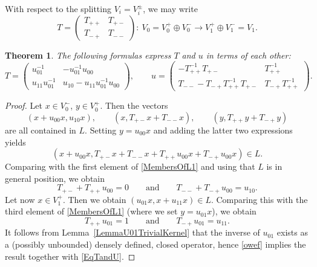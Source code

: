 \documentclass[pdftex]{sigma}
\numberwithin{equation}{section}
\newtheorem{Theorem}{Theorem}[section]
\begin{document}
With respect to the splitting $V_i = V_i^{\pm}$, we may write
\begin{equation*}
 T = \begin{pmatrix} T_{++} & T_{+-} \\ T_{-+} & T_{--} \end{pmatrix}\colon\ V_0 = V_0^+ \oplus V_0^- \longrightarrow V_1^+ \oplus V_1^- = V_1.
\end{equation*}

\begin{Theorem} \label{TheoremRelationTu}
The following formulas express $T$ and $u$ in terms of each other:
\begin{equation*}
 T = \begin{pmatrix} u_{01}^{-1} & -u_{01}^{-1} u_{00} \\ u_{11} u_{01}^{-1} & u_{10} - u_{11} u_{01}^{-1}u_{00} \end{pmatrix}, \qquad
 u = \begin{pmatrix} - T_{++}^{-1} T_{+-} & T_{++}^{-1} \\ T_{--} - T_{-+}T_{++}^{-1} T_{+-} & T_{-+}T_{++}^{-1}\end{pmatrix}.
\end{equation*}
\end{Theorem}

\begin{proof}
Let $x \in V_0^-$, $y \in V_0^+$. Then the vectors
\begin{equation} \label{MembersOfL1}
 (x + u_{00}x, u_{10} x), \qquad (x, T_{+-}x + T_{--}x), \qquad (y, T_{++}y + T_{-+} y)
 \end{equation}
 are all contained in $L$.
 Setting $y = u_{00} x$ and adding the latter two expressions yields
 \begin{equation*}
 (x + u_{00}x, T_{+-}x + T_{--}x + T_{++}u_{00}x + T_{-+} u_{00}x) \in L.
 \end{equation*}
 Comparing with the first element of \eqref{MembersOfL1} and using that $L$ is in general position, we obtain
 \begin{equation} \label{EqTandU}
 T_{+-} + T_{++}u_{00} = 0 \qquad \text{and} \qquad T_{--} + T_{-+}u_{00} = u_{10}.
 \end{equation}
 Let now $x \in V_1^+$.
 Then we obtain $(u_{01}x, x + u_{11}x) \in L$.
 Comparing this with the third element of \eqref{MembersOfL1} (where we set $y = u_{01}x$), we obtain
 \begin{equation} \label{owef}
 T_{++}u_{01} = 1 \qquad \text{and} \qquad T_{-+} u_{01} = u_{11}.
 \end{equation}
 It follows from Lemma~\ref{LemmaU01TrivialKernel} that the inverse of $u_{01}$ exists as a (possibly unbounded) densely defined, closed operator, hence \eqref{owef} implies the result together with \eqref{EqTandU}.
\end{proof}
\end{document}
